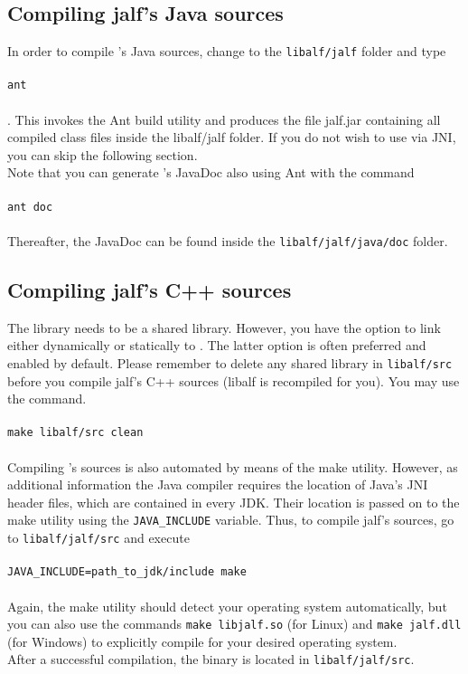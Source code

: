 \subsection{Compiling jalf’s Java sources}
In order to compile \jalf’s Java sources, change to the \texttt{libalf/jalf} folder and type \\ \\ \texttt{ant} \\ \\. This invokes the Ant build utility and produces the file jalf.jar containing all compiled class files inside the libalf/jalf folder. If you do not wish to use \jalf via JNI, you can skip the following section. \\
Note that you can generate \jalf’s JavaDoc also using Ant with the command \\ \\ \texttt{ant doc} \\ \\Thereafter, the JavaDoc can be found inside the \texttt{libalf/jalf/java/doc} folder.

\subsection{Compiling jalf’s C++ sources}
The \jalf \cpp library needs to be a shared library. However, you have the option to link \libalf either dynamically or statically to \jalf. The latter option is often preferred and enabled by default. Please remember to delete any shared library in \texttt{libalf/src} before you compile jalf’s C++ sources (libalf is recompiled for you). You may use the command. 
\\ \\ 
\texttt{make libalf/src clean} 
\paragraph{}
Compiling \jalf’s \cpp sources is also automated by means of the make utility. However, as additional information the Java compiler requires the location of Java’s JNI header files, which are contained in every JDK. Their location is passed on to the make utility using the \texttt{JAVA\_INCLUDE} variable. Thus, to compile jalf’s \cpp sources, go to \texttt{libalf/jalf/src} and execute
\\ \\
\texttt{JAVA\_INCLUDE=path\_to\_jdk/include make}
\\ \\
Again, the make utility should detect your operating system automatically, but you can also use the commands \texttt{make libjalf.so} (for Linux) and \texttt{make jalf.dll} (for Windows) to explicitly compile \jalf for your desired operating system. 
\\
After a successful compilation, the binary is located in \texttt{libalf/jalf/src}.

